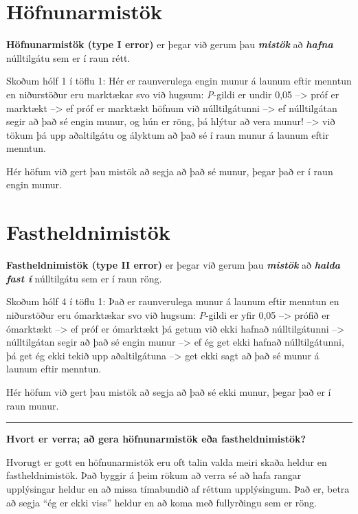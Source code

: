 \documentclass[
]{book}
\begin{document}
\hypertarget{huxf6fnunarmistuxf6k}{%
\section{Höfnunarmistök}\label{huxf6fnunarmistuxf6k}}

\textbf{Höfnunarmistök (type I error)} er þegar við gerum þau \textbf{\emph{mistök}} að \textbf{\emph{hafna}} núlltilgátu sem er í raun rétt.

Skoðum hólf 1 í töflu 1: Hér er raunverulega engin munur á launum eftir menntun en niðurstöður eru marktækar svo við hugsum: \emph{P}-gildi er undir 0,05 --\textgreater{} próf er marktækt --\textgreater{} ef próf er marktækt höfnum við núlltilgátunni --\textgreater{} ef núlltilgátan segir að það sé engin munur, og hún er röng, þá hlýtur að vera munur! --\textgreater{} við tökum þá upp aðaltilgátu og ályktum að það sé í raun munur á launum eftir menntun.

Hér höfum við gert þau mistök að segja að það sé munur, þegar það er í raun engin munur.

\hypertarget{fastheldnimistuxf6k}{%
\section{Fastheldnimistök}\label{fastheldnimistuxf6k}}

\textbf{Fastheldnimistök (type II error)} er þegar við gerum þau \textbf{\emph{mistök}} að \textbf{\emph{halda fast í}} núlltilgátu sem er í raun röng.

Skoðum hólf 4 í töflu 1: Það er raunverulega munur á launum eftir menntun en niðurstöður eru ómarktækar svo við hugsum: \emph{P}-gildi er yfir 0,05 --\textgreater{} prófið er ómarktækt --\textgreater{} ef próf er ómarktækt þá getum við ekki hafnað núlltilgátunni --\textgreater{} núlltilgátan segir að það sé engin munur --\textgreater{} ef ég get ekki hafnað núlltilgátunni, þá get ég ekki tekið upp aðaltilgátuna --\textgreater{} get ekki sagt að það sé munur á launum eftir menntun.

Hér höfum við gert þau mistök að segja að það sé ekki munur, þegar það er í raun munur.

\begin{center}\rule{0.5\linewidth}{0.5pt}\end{center}

\textbf{Hvort er verra; að gera höfnunarmistök eða fastheldnimistök?}

Hvorugt er gott en höfnunarmistök eru oft talin valda meiri skaða heldur en fastheldnimistök. Það byggir á þeim rökum að verra sé að hafa rangar upplýsingar heldur en að missa tímabundið af réttum upplýsingum. Það er, betra að segja ``ég er ekki viss'' heldur en að koma með fullyrðingu sem er röng.
\end{document}
